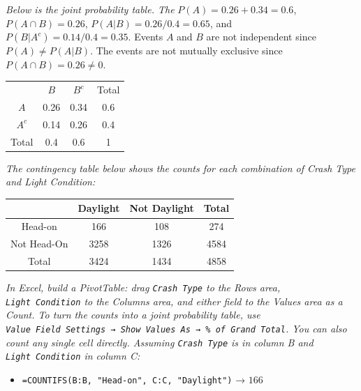 \documentclass[
  11pt,
  letterpaper,
  DIV=11,
  numbers=noendperiod,
  oneside,
  open=any]{scrreprt}
\providecommand{\tightlist}{%
  \setlength{\itemsep}{0pt}\setlength{\parskip}{0pt}}\usepackage{longtable,booktabs,array}
\newenvironment{bsanswerkey}[2]{%
  \begin{tcolorbox}[bsbase, colback=bspaper2, colframe=bsline, fontupper=\small,
    title={\hypertarget{a-#1}{}\label{a-#1}\hyperlink{q-#1}{\textcolor{bsink2}{\MakeUppercase{#2}}}\hfill
      \hyperlink{q-#1}{\textcolor{bsaccent}{\normalfont\footnotesize back to page \pageref{q-#1}}}}]}%
  {\end{tcolorbox}}
\begin{document}
\begin{bsanswerkey}{bsans76}{Exercise 3, question 1}

\emph{Below is the joint probability table. The} \(P(A)=0.26+0.34=0.6\),
\(P(A \cap B)=0.26\), \(P(A|B)=0.26/0.4=0.65\), and
\(P(B|A^c)=0.14/0.4=0.35\). Events \(A\) and \(B\) are not independent
since \(P(A) \neq P(A|B)\). The events are not mutually exclusive since
\(P(A \cap B)=0.26 \neq 0\).

\begin{center}
\begin{tabular}{cccc}
\toprule
 & \(B\) & \(B^c\) & Total \\
\(A\) & 0.26 & 0.34 & 0.6 \\
\(A^c\) & 0.14 & 0.26 & 0.4 \\
Total & 0.4 & 0.6 & 1 \\
\bottomrule
\end{tabular}
\end{center}

\end{bsanswerkey}

\begin{bsanswerkey}{bsans77}{Exercise 4, question 1}

\emph{The contingency table below shows the counts for each combination
of Crash Type and Light Condition:}

\begin{center}
\begin{tabular}{cccc}
\toprule
 & Daylight & Not Daylight & Total \\
\midrule
Head-on & 166 & 108 & 274 \\
Not Head-On & 3258 & 1326 & 4584 \\
Total & 3424 & 1434 & 4858 \\
\bottomrule
\end{tabular}
\end{center}

\emph{In Excel, build a PivotTable: drag \texttt{Crash\ Type} to the
Rows area, \texttt{Light\ Condition} to the Columns area, and either
field to the Values area as a Count. To turn the counts into a joint
probability table, use
\texttt{Value\ Field\ Settings\ →\ Show\ Values\ As\ →\ \%\ of\ Grand\ Total}.
You can also count any single cell directly. Assuming
\texttt{Crash\ Type} is in column B and \texttt{Light\ Condition} in
column C:}

\begin{itemize}
\tightlist
\item
  \texttt{=COUNTIFS(B:B,\ "Head-on",\ C:C,\ "Daylight")} → \(166\)
\end{itemize}

\end{bsanswerkey}
\end{document}
